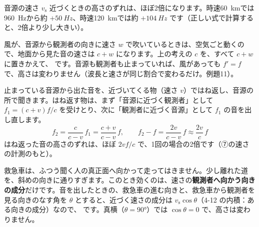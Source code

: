 \begin{phbaisuru}{音源の速さ $v_{\mathrm s}$}
近づくときの高さのずれは、ほぼ2倍になります。時速\qty{60}{km}では\qty{960}{Hz}から約 $+\qty{50}{Hz}$、時速\qty{120}{km}では約 $+\qty{104}{Hz}$ です（正しい式で計算すると、2倍より少し大きい）。
\end{phbaisuru}

風が、音源から観測者の向きに速さ $w$ で吹いているときは、空気ごと動くので、地面から見た音の速さは $c+w$ になります。上の考えの $c$ を、すべて $c+w$ に置きかえて、
\label{ph:波-8:kaze}です。音源も観測者も止まっていれば、風があっても $f'=f$ で、高さは変わりません（波長と速さが同じ割合で変わるだけ。例題11）。

止まっている音源から出た音を、近づいてくる物（速さ $v$）ではね返し、音源の所で聞きます。はね返す物は、まず「音源に近づく観測者」として $f_1=(c+v)f/c$ を受けとり、次に「観測者に近づく音源」として $f_1$ の音を出し直します。
\[f_2=\frac{c}{c-v}\,f_1=\frac{c+v}{c-v}\,f,\qquad f_2-f=\frac{2v}{c-v}\,f\approx\frac{2v}{c}\,f\]
はね返った音の高さのずれは、ほぼ $2vf/c$ で、1回の場合の2倍です（⑦の速さの計測のもと）。

\begin{phflow}[ドップラー効果]
\end{phflow}

救急車は、ふつう聞く人の真正面へ向かって走ってはきません。少し離れた道を、斜めの向きに通りすぎます。このとき効くのは、速さの\textbf{観測者へ向かう向きの成分}だけです。音を出したときの、救急車の進む向きと、救急車から観測者を見る向きのなす角を $\theta$ とすると、近づく速さの成分は $v_{\mathrm s}\cos\theta$（4-12 の内積：ある向きの成分）なので、
\label{ph:波-8:naname}です。真横（$\theta=90°$）では $\cos\theta=0$ で、高さは変わりません。

